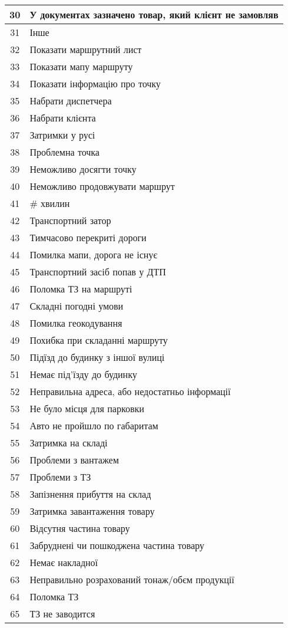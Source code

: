 \begin{longtable}[c]{ | c | l | }
	30 & У документах зазначено товар, який клієнт не замовляв \\
	\hline
	31 & Інше \\
	\hline
	32 & Показати маршрутний лист \\
	\hline
	33 & Показати мапу маршруту \\
	\hline
	34 & Показати інформацію про точку \\
	\hline
	35 & Набрати диспетчера \\
	\hline
	36 & Набрати клієнта \\
	\hline
	37 & Затримки у русі \\
	\hline
	38 & Проблемна точка \\
	\hline
	39 & Неможливо досягти точку \\
	\hline
	40 & Неможливо продовжувати маршрут \\
	\hline
	41 & \# хвилин \\
	\hline
	42 & Транспортний затор \\
	\hline
	43 & Тимчасово перекриті дороги \\
	\hline
	44 & Помилка мапи, дорога не існує \\
	\hline
	45 & Транспортний засіб попав у ДТП \\
	\hline
	46 & Поломка ТЗ на маршруті \\
	\hline
	47 & Складні погодні умови \\
	\hline
	48 & Помилка геокодування \\
	\hline
	49 & Похибка при складанні маршруту \\
	\hline
	50 & Підїзд до будинку з іншої вулиці \\
	\hline
	51 & Немає під'їзду до будинку \\
	\hline
	52 & Неправильна адреса, або недостатньо інформації \\
	\hline
	53 & Не було місця для парковки \\
	\hline
	54 & Авто не пройшло по габаритам \\
	\hline
	55 & Затримка на складі \\
	\hline
	56 & Проблеми з вантажем \\
	\hline
	57 & Проблеми з ТЗ \\
	\hline
	58 & Запізнення прибуття на склад \\
	\hline
	59 & Затримка завантаження товару \\
	\hline
	60 & Відсутня частина товару \\
	\hline
	61 & Забруднені чи пошкоджена частина товару \\
	\hline
	62 & Немає накладної \\
	\hline
	63 & Неправильно розрахований тонаж/обєм продукції \\
	\hline
	64 & Поломка ТЗ \\
	\hline
	65 & ТЗ не заводится \\
\end{longtable}%

